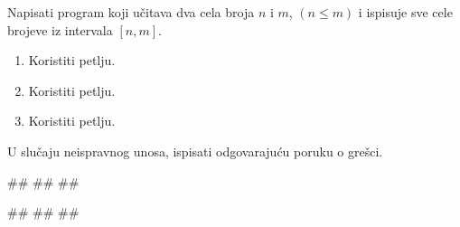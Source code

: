 \begin{Exercise}[label=PET_04] 
Napisati program koji učitava dva cela broja $n$ i $m$, $(n \leq m)$ i ispisuje sve
cele brojeve iz intervala $[n,m]$.
\begin{enumerate}
\item Koristiti  petlju.
\item Koristiti  petlju.
\item Koristiti  petlju.
 \end{enumerate}
U slučaju neispravnog unosa, ispisati odgovarajuću poruku o grešci. 

\begin{miditest}
\begin{upotreba}{1}
#\naslovInt#
##
##
\end{upotreba}
\end{miditest}
\begin{miditest}
\begin{upotreba}{2}
#\naslovInt#
##
##
\end{upotreba}
\end{miditest}
\end{Exercise}
\ifresenja
\begin{Answer}[ref=PET_04]
\end{Answer}
\fi


